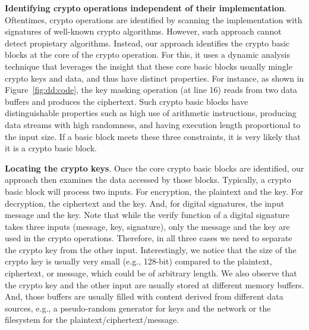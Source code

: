\begin{compactitem}
\item
\textbf{Identifying crypto operations independent of their implementation}. 
Oftentimes, crypto operations are identified by scanning the implementation with signatures of well-known crypto algorithms. 
However, such approach cannot detect propietary algorithms.  
Instead, our approach identifies the {crypto basic blocks} at the core of the crypto operation. 
For this, it uses a dynamic analysis technique that leverages the insight that these core basic blocks usually mingle crypto keys and data, and thus have distinct properties. 
For instance, as shown in Figure~\ref{fig:dd:code}, the key masking operation (at line 16) reads from two data buffers and produces the ciphertext. 
Such crypto basic blocks have distinguishable properties such as high use of arithmetic instructions, producing data streams with high randomness, and having execution length proportional to the input size. 
If a basic block meets these three constraints, it is very likely that it is a crypto basic block.

\item
\textbf{Locating the crypto keys}.
Once the core {crypto basic blocks} are identified, our approach then examines the data accessed by those blocks. 
Typically, {a crypto basic block} will process two inputs. 
For encryption, the plaintext and the key. 
For decryption, the ciphertext and the key. 
And, for digital signatures, the input message and the key. 
Note that while the verify function of a digital signature takes three inputs (message, key, signature), only the message and the key are used in the crypto operations.
Therefore, in all three cases we need to separate the crypto key from the other input. 
Interestingly, we notice that the size of the crypto key is usually very small (e.g., 128-bit) compared to the plaintext, ciphertext, or message, which could be of arbitrary length. 
We also observe that the crypto key and the other input are usually stored at different memory buffers. 
And, those buffers are usually filled with content derived from different data sources, e.g., a pseudo-random generator for keys and the network or the filesystem for the plaintext/ciphertext/message. 


\end{compactitem}

